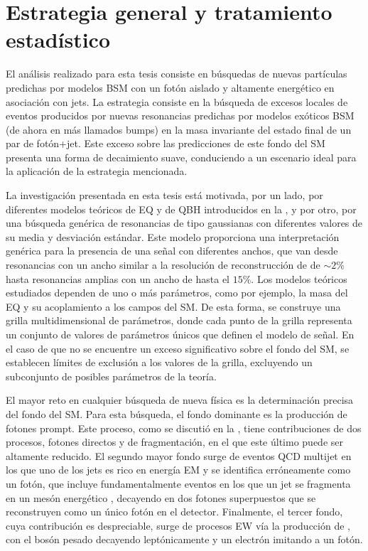 \chapter{Estrategia general y tratamiento estadístico}
\label{ch:strategy}





El análisis realizado para esta tesis consiste en búsquedas de nuevas partículas predichas por modelos \ac{BSM} con un fotón aislado y altamente energético en asociación con jets. La estrategia consiste en la búsqueda de excesos locales de eventos producidos por nuevas resonancias predichas por modelos exóticos \ac{BSM} (de ahora en más llamados bumps) en la masa invariante del estado final de un par de fotón+jet. Este exceso sobre las predicciones de este fondo del \ac{SM} presenta una forma de decaimiento suave, conduciendo a un escenario ideal para la aplicación de la estrategia mencionada.

La investigación presentada en esta tesis está motivada, por un lado, por diferentes modelos teóricos de \acf{EQ} y de \acf{QBH} introducidos en la \Sect{\ref{sec:theory:bsm}}, y por otro, por una búsqueda genérica de resonancias de tipo gaussianas con diferentes valores de su media y desviación estándar. Este modelo proporciona una interpretación genérica para la presencia de una señal con diferentes anchos, que van desde resonancias con un ancho similar a la resolución de reconstrucción de \myj de \(\sim 2\%\) hasta resonancias amplias con un ancho de hasta el \(15\%\).
Los modelos teóricos estudiados dependen de uno o más parámetros, como por ejemplo, la masa del \ac{EQ} y su acoplamiento a los campos del \ac{SM}. De esta forma, se construye una grilla multidimensional de parámetros, donde cada punto de la grilla representa un conjunto de valores de parámetros únicos que definen el modelo de señal. En el caso de que no se encuentre un exceso significativo sobre el fondo del \ac{SM}, se establecen límites de exclusión a los valores de la grilla, excluyendo un subconjunto de posibles parámetros de la teoría.


El mayor reto en cualquier búsqueda de nueva física es la determinación precisa del fondo del \ac{SM}. Para esta búsqueda, el fondo dominante es la producción de fotones prompt. Este proceso, como se discutió en la \Sect{\ref{subsec:theory:sm:prompt_photon}}, tiene contribuciones de dos procesos, fotones directos y de fragmentación, en el que este último puede ser altamente reducido. El segundo mayor fondo surge de eventos \ac{QCD} multijet en los que uno de los jets es rico en energía \ac{EM} y se identifica erróneamente como un fotón, que incluye fundamentalmente eventos en los que un jet se fragmenta en un mesón energético \pizero, decayendo en dos fotones superpuestos que se reconstruyen como un único fotón en el detector. Finalmente, el tercer fondo, cuya contribución es despreciable, surge de procesos \ac{EW} vía la producción de \WZjet, con el bosón pesado decayendo leptónicamente y un electrón imitando a un fotón.


